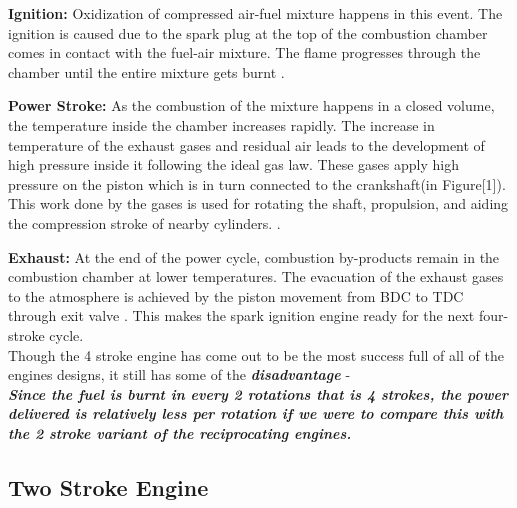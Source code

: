 \documentclass[11pt]{article}
\begin{document}
\textbf{Ignition:} Oxidization of compressed air-fuel mixture happens in this event. The ignition is caused due to the spark plug at the top of the combustion chamber comes in contact with the fuel-air mixture. The flame progresses through the chamber until the entire mixture gets burnt \cite{ref2}. 

\textbf{Power Stroke:} As the combustion of the mixture happens in a closed volume, the temperature inside the chamber increases rapidly. The increase in temperature of the exhaust gases and residual air leads to the development of high pressure inside it following the ideal gas law. These gases apply high pressure on the piston which is in turn connected to the crankshaft(in Figure[1]). This work done by the gases is used for rotating the shaft, propulsion, and aiding the compression stroke of nearby cylinders. \cite{ref4}. 

\textbf{Exhaust:} At the end of the power cycle, combustion by-products remain in the combustion chamber at lower temperatures. The evacuation of the exhaust gases to the atmosphere is achieved by the piston movement from BDC to TDC through exit valve \cite{ref2}. This makes the spark ignition engine ready for the next four-stroke cycle.\\
Though the 4 stroke engine has come out to be the most success full of all of the engines designs, it still has some of the \textbf{\emph{disadvantage}} -\\ 
\textit{\textbf{Since the fuel is burnt in every 2 rotations that is 4 strokes, the power delivered is relatively less per rotation if we were to compare this with the 2 stroke variant of the reciprocating engines. }}
\subsection{Two Stroke Engine}
\end{document}
